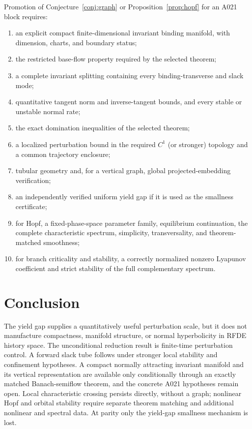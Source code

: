 \documentclass[11pt]{article}
\theoremstyle{definition}
\theoremstyle{remark}
\begin{document}
Promotion of Conjecture~\ref{conj:graph} or Proposition~\ref{prop:hopf} for an A021 block requires:
\begin{enumerate}
\item an explicit compact finite-dimensional invariant binding manifold, with dimension, charts, and boundary status;
\item the restricted base-flow property required by the selected theorem;
\item a complete invariant splitting containing every binding-transverse and slack mode;
\item quantitative tangent norm and inverse-tangent bounds, and every stable or unstable normal rate;
\item the exact domination inequalities of the selected theorem;
\item a localized perturbation bound in the required $C^1$ (or stronger) topology and a common trajectory enclosure;
\item tubular geometry and, for a vertical graph, global projected-embedding verification;
\item an independently verified uniform yield gap if it is used as the smallness certificate;
\item for Hopf, a fixed-phase-space parameter family, equilibrium continuation, the complete characteristic spectrum, simplicity, transversality, and theorem-matched smoothness;
\item for branch criticality and stability, a correctly normalized nonzero Lyapunov coefficient and strict stability of the full complementary spectrum.
\end{enumerate}

\section{Conclusion}

The yield gap supplies a quantitatively useful perturbation scale, but it does not manufacture compactness, manifold structure, or normal hyperbolicity in RFDE history space. The unconditional reduction result is finite-time perturbation control. A forward slack tube follows under stronger local stability and confinement hypotheses. A compact normally attracting invariant manifold and its vertical representation are available only conditionally through an exactly matched Banach-semiflow theorem, and the concrete A021 hypotheses remain open. Local characteristic crossing persists directly, without a graph; nonlinear Hopf and orbital stability require separate theorem matching and additional nonlinear and spectral data. At parity only the yield-gap smallness mechanism is lost.
\end{document}
